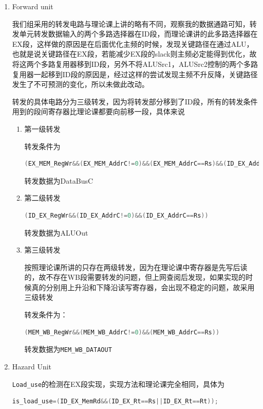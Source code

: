 \documentclass{ctexart}
\begin{document}
			\begin{enumerate}
\item Forward unit	

我们组采用的转发电路与理论课上讲的略有不同，观察我的数据通路可知，转发单元转发数据输入的两个多路选择器在ID段，而理论课讲的此多路选择器在EX段，这样做的原因是在后面优化主频的时候，发现关键路径在通过ALU，也就是说关键路径在EX段，若能减少EX段的slack则主频必定能得到优化，故将这两个多路复用器移到ID段，另外不将ALUSrc1，ALUSrc2控制的两个多路复用器一起移到ID段的原因是，经过这样的尝试发现主频不升反降，关键路径发生了不可预测的变化，所以未做此改动。

转发的具体电路分为三级转发，因为将转发部分移到了ID段，所有的转发条件用到的段间寄存器比理论课都要向前移一段，具体来说

\begin{enumerate}
\item 第一级转发

转发条件为

\begin{lstlisting}[language = verilog]
(EX_MEM_RegWr&&(EX_MEM_AddrC!=0)&&(EX_MEM_AddrC==Rs)&&(ID_EX_AddrC!=Rs||~ID_EX_RegWr))
\end{lstlisting}

转发数据为DataBusC

\item 第二级转发
\begin{lstlisting}[language = verilog]
(ID_EX_RegWr&&(ID_EX_AddrC!=0)&&(ID_EX_AddrC==Rs))
\end{lstlisting}

转发数据为ALUOut

\item 第三级转发

按照理论课所讲的只存在两级转发，因为在理论课中寄存器是先写后读的，故不存在WB段需要转发的问题，但上网查阅后发现，如果实现的时候真的分别用上升沿和下降沿读写寄存器，会出现不稳定的问题，故采用三级转发

转发条件为：
\begin{lstlisting}[language = verilog]
(MEM_WB_RegWr&&(MEM_WB_AddrC!=0)&&(MEM_WB_AddrC==Rs))
\end{lstlisting}
转发数据为\verb"MEM_WB_DATAOUT"

\end{enumerate}
	
	\item Hazard Unit

\verb"Load_use"的检测在EX段实现，实现方法和理论课完全相同，具体为
\begin{lstlisting}[language = verilog]
 is_load_use=(ID_EX_MemRd&&(ID_EX_Rt==Rs||ID_EX_Rt==Rt));
\end{lstlisting}


\end{enumerate}
\end{document}
